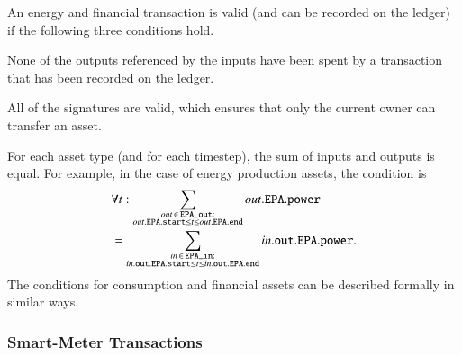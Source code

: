 An energy and financial transaction is valid (and can be recorded on the ledger) if the following three conditions hold.
\begin{compactitem}
\item None of the outputs referenced by the inputs have been spent by a transaction that has been recorded on the ledger.
\item All of the signatures are valid, which ensures that only the current owner can transfer an asset.
\item For each asset type (and for each timestep), the sum of inputs and outputs is equal.
For example, in the case of energy production assets, the condition is
\begin{align*}
& \forall t: \sum_{\substack{out \,\in\, \field{EPA\_out}:\\out.\field{EPA}.\field{start} \leq t \leq out.\field{EPA}.\field{end}}} out.\field{EPA}.\field{power} \nonumber \\
& = \sum_{\substack{in \,\in\, \field{EPA\_in}:\\in.\field{out}.\field{EPA}.\field{start} \leq t \leq in.\field{out}.\field{EPA}.\field{end}}} in.\field{out}.\field{EPA}.\field{power}  .
%
\end{align*}
The conditions for consumption and financial assets can be described formally in similar ways.
\end{compactitem}

\subsubsection{Smart-Meter Transactions}

